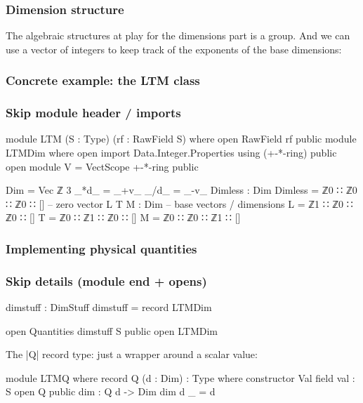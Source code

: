 \documentclass[aspectratio=169]{beamer}
\begin{document}
\begin{frame}
\frametitle{Dimension structure}
The algebraic structures at play for the dimensions part is a group.
And we can use a vector of integers to keep track of the exponents of
the base dimensions:

\frametitle{Concrete example: the LTM class}
\subsubsection{Skip module header / imports}
\begin{code}
module LTM (S : Type) (rf : RawField S) where
  open RawField rf public
  module LTMDim where
    open import Data.Integer.Properties using (+-*-ring) public
    open module V = VectScope +-*-ring public
\end{code}

\begin{code}
    Dim = Vec ℤ 3
    _*d_ = _+v_
    _/d_ = _-v_
    Dimless  : Dim
    Dimless  = ℤ0 ∷ ℤ0 ∷ ℤ0 ∷ []  -- zero vector
    L T M    : Dim                -- base vectors / dimensions
    L        = ℤ1 ∷ ℤ0 ∷ ℤ0 ∷ []
    T        = ℤ0 ∷ ℤ1 ∷ ℤ0 ∷ []
    M        = ℤ0 ∷ ℤ0 ∷ ℤ1 ∷ []
\end{code}
\end{frame}
\begin{frame}
\frametitle{Implementing physical quantities}
\subsubsection{Skip details (module end + opens)}
\begin{code}
  dimstuff : DimStuff
  dimstuff = record { LTMDim }

  open Quantities dimstuff S public
  open LTMDim
\end{code}
The |Q| record type: just a wrapper around a scalar value:
\begin{code}
  module LTMQ where
    record Q (d : Dim) : Type where
      constructor Val
      field
        val : S
    open Q public
    dim : Q d -> Dim
    dim {d} _ = d
\end{code}
\end{frame}
\end{document}
